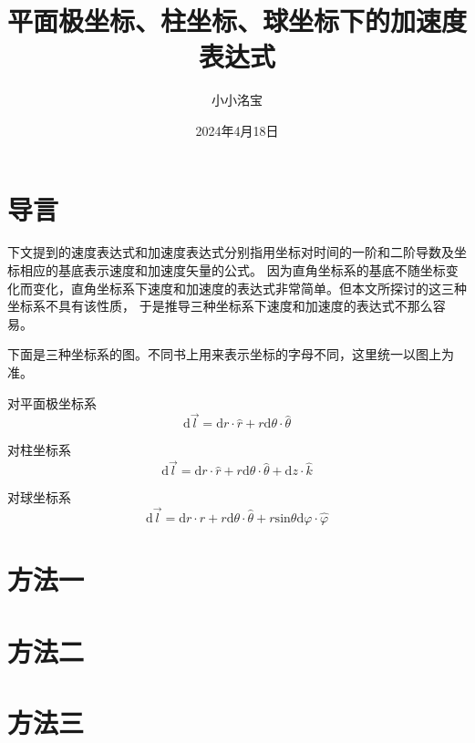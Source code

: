 \documentclass{ctexart}
\title{平面极坐标、柱坐标、球坐标下的加速度表达式}
\author{小小洺宝}
\date{2024年4月18日}  %
\begin{document}
    \maketitle  %
    
    \section{导言}\label{sec:1}

    下文提到的速度表达式和加速度表达式分别指用坐标对时间的一阶和二阶导数及坐标相应的基底表示速度和加速度矢量的公式。
    因为直角坐标系的基底不随坐标变化而变化，直角坐标系下速度和加速度的表达式非常简单。但本文所探讨的这三种坐标系不具有该性质，
    于是推导三种坐标系下速度和加速度的表达式不那么容易。

    下面是三种坐标系的图。不同书上用来表示坐标的字母不同，这里统一以图上为准。

    对平面极坐标系
    \begin{equation*}
        \mathrm{d}\vec{l} = \mathrm{d}r\cdot\hat{r} + r\mathrm{d}\theta\cdot\hat{\theta}
    \end{equation*}
    
    对柱坐标系
    \begin{equation*}
        \mathrm{d}\vec{l} = \mathrm{d}r\cdot\hat{r} + r\mathrm{d}\theta\cdot\hat{\theta} + \mathrm{d}z\cdot\hat{k}
    \end{equation*}
    
    对球坐标系
    \begin{equation*}
        \mathrm{d}\vec{l} = \mathrm{d}r\cdot\hat{r} + r\mathrm{d}\theta\cdot\hat{\theta} + r\mathrm{sin}\theta
        \mathrm{d}\varphi\cdot\hat{\varphi}
    \end{equation*}

    \section{方法一}\label{sec:2}

    \section{方法二}\label{sec:3}

    \section{方法三}\label{sec:4}
\end{document}
